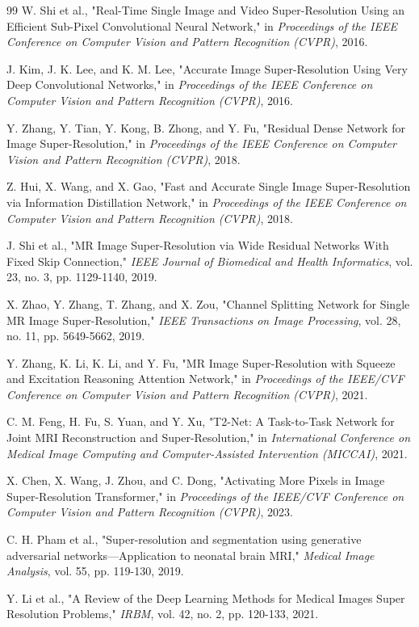 \begin{thebibliography}{99}
 W. Shi et al., "Real-Time Single Image and Video Super-Resolution Using an Efficient Sub-Pixel Convolutional Neural Network," in \textit{Proceedings of the IEEE Conference on Computer Vision and Pattern Recognition (CVPR)}, 2016.

 J. Kim, J. K. Lee, and K. M. Lee, "Accurate Image Super-Resolution Using Very Deep Convolutional Networks," in \textit{Proceedings of the IEEE Conference on Computer Vision and Pattern Recognition (CVPR)}, 2016.

 Y. Zhang, Y. Tian, Y. Kong, B. Zhong, and Y. Fu, "Residual Dense Network for Image Super-Resolution," in \textit{Proceedings of the IEEE Conference on Computer Vision and Pattern Recognition (CVPR)}, 2018.

 Z. Hui, X. Wang, and X. Gao, "Fast and Accurate Single Image Super-Resolution via Information Distillation Network," in \textit{Proceedings of the IEEE Conference on Computer Vision and Pattern Recognition (CVPR)}, 2018.

 J. Shi et al., "MR Image Super-Resolution via Wide Residual Networks With Fixed Skip Connection," \textit{IEEE Journal of Biomedical and Health Informatics}, vol. 23, no. 3, pp. 1129-1140, 2019.

 X. Zhao, Y. Zhang, T. Zhang, and X. Zou, "Channel Splitting Network for Single MR Image Super-Resolution," \textit{IEEE Transactions on Image Processing}, vol. 28, no. 11, pp. 5649-5662, 2019.

 Y. Zhang, K. Li, K. Li, and Y. Fu, "MR Image Super-Resolution with Squeeze and Excitation Reasoning Attention Network," in \textit{Proceedings of the IEEE/CVF Conference on Computer Vision and Pattern Recognition (CVPR)}, 2021.

 C. M. Feng, H. Fu, S. Yuan, and Y. Xu, "T2-Net: A Task-to-Task Network for Joint MRI Reconstruction and Super-Resolution," in \textit{International Conference on Medical Image Computing and Computer-Assisted Intervention (MICCAI)}, 2021.

 X. Chen, X. Wang, J. Zhou, and C. Dong, "Activating More Pixels in Image Super-Resolution Transformer," in \textit{Proceedings of the IEEE/CVF Conference on Computer Vision and Pattern Recognition (CVPR)}, 2023.

 C. H. Pham et al., "Super-resolution and segmentation using generative adversarial networks—Application to neonatal brain MRI," \textit{Medical Image Analysis}, vol. 55, pp. 119-130, 2019.

 Y. Li et al., "A Review of the Deep Learning Methods for Medical Images Super Resolution Problems," \textit{IRBM}, vol. 42, no. 2, pp. 120-133, 2021.

\end{thebibliography}
